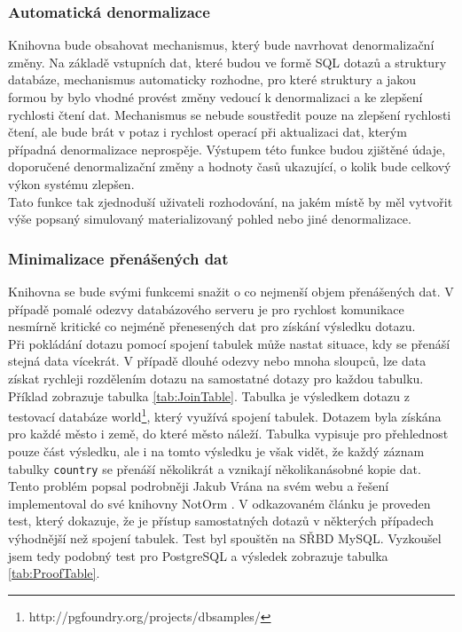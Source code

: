 \documentclass[ing,male,java,dept456]{diploma}						%
\begin{document}
\subsubsection{Automatická denormalizace}

Knihovna bude obsahovat mechanismus, který bude navrhovat denormalizační změny. Na základě vstupních dat, které budou ve formě SQL dotazů a struktury databáze, mechanismus automaticky rozhodne, pro které struktury a jakou formou by bylo vhodné provést změny vedoucí k denormalizaci a ke zlepšení rychlosti čtení dat. Mechanismus se nebude soustředit pouze na zlepšení rychlosti čtení, ale bude brát v potaz i rychlost operací při aktualizaci dat, kterým případná denormalizace neprospěje. Výstupem této funkce budou zjištěné údaje, doporučené denormalizační změny a hodnoty časů ukazující, o kolik bude celkový výkon systému zlepšen. \\
Tato funkce tak zjednoduší uživateli rozhodování, na jakém místě by měl vytvořit výše popsaný simulovaný materializovaný pohled nebo jiné denormalizace.

\subsubsection{Minimalizace přenášených dat}
\label{subsubsec:Selectin}

Knihovna se bude svými funkcemi snažit o co nejmenší objem přenášených dat. V případě pomalé odezvy databázového serveru je pro rychlost komunikace nesmírně kritické co nejméně přenesených dat pro získání výsledku dotazu. \\
Při pokládání dotazu pomocí spojení tabulek může nastat situace, kdy se přenáší stejná data vícekrát. V případě dlouhé odezvy nebo mnoha sloupců, lze data získat rychleji rozdělením dotazu na samostatné dotazy pro každou tabulku. Příklad zobrazuje tabulka \ref{tab:JoinTable}. Tabulka je výsledkem dotazu z testovací databáze world\footnote{http://pgfoundry.org/projects/dbsamples/}, který využívá spojení tabulek. Dotazem byla získána pro každé město i země, do které město náleží. Tabulka vypisuje pro přehlednost pouze část výsledku, ale i na tomto výsledku je však vidět, že každý záznam tabulky \lstinline[style=inlinepython]|country| se přenáší několikrát a vznikají několikanásobné kopie dat. \\
Tento problém popsal podrobněji Jakub Vrána na svém webu a řešení implementoval do své knihovny NotOrm \cite{notorm}. V odkazovaném článku je proveden test, který dokazuje, že je přístup samostatných dotazů v některých případech výhodnější než spojení tabulek. Test byl spouštěn na SŘBD MySQL. Vyzkoušel jsem tedy podobný test pro PostgreSQL a výsledek zobrazuje tabulka \ref{tab:ProofTable}. \\
\end{document}
